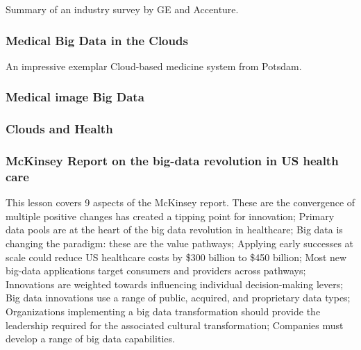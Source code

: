 Summary of an industry survey by GE and Accenture.



\subsubsection{Medical Big Data in the
Clouds}\label{medical-big-data-in-the-clouds}

An impressive exemplar Cloud-based medicine system from Potsdam.



\subsubsection{Medical image Big Data}\label{medical-image-big-data}


\subsubsection{Clouds and Health}\label{clouds-and-health}



\subsubsection{McKinsey Report on the big-data revolution in US health
care}\label{mckinsey-report-on-the-big-data-revolution-in-us-health-care}

This lesson covers 9 aspects of the McKinsey report. These are the
convergence of multiple positive changes has created a tipping point for
innovation; Primary data pools are at the heart of the big data
revolution in healthcare; Big data is changing the paradigm: these are
the value pathways; Applying early successes at scale could reduce US
healthcare costs by \$300 billion to \$450 billion; Most new big-data
applications target consumers and providers across pathways; Innovations
are weighted towards influencing individual decision-making levers; Big
data innovations use a range of public, acquired, and proprietary data
types; Organizations implementing a big data transformation should
provide the leadership required for the associated cultural
transformation; Companies must develop a range of big data capabilities.

